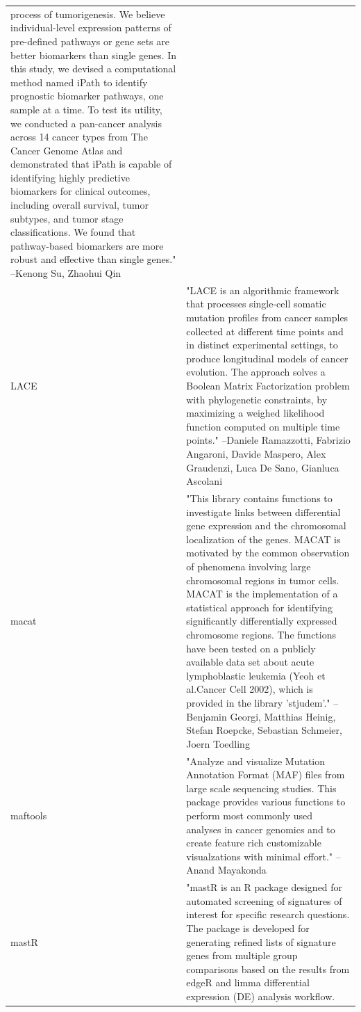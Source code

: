 \documentclass[]{article}
\begin{document}
\begin{longtable}[t]{l>{\raggedright\arraybackslash}p{25em}}
process of tumorigenesis. We believe individual-level
expression patterns of pre-defined pathways or gene sets are
better biomarkers than single genes. In this study, we devised
a computational method named iPath to identify prognostic
biomarker pathways, one sample at a time. To test its utility,
we conducted a pan-cancer analysis across 14 cancer types from
The Cancer Genome Atlas and demonstrated that iPath is capable
of identifying highly predictive biomarkers for clinical
outcomes, including overall survival, tumor subtypes, and tumor
stage classifications. We found that pathway-based biomarkers
are more robust and effective than single genes." --Kenong Su, Zhaohui Qin\\
\addlinespace
LACE & "LACE is an algorithmic framework that processes
single-cell somatic mutation profiles from cancer samples
collected at different time points and in distinct experimental
settings, to produce longitudinal models of cancer evolution.
The approach solves a Boolean Matrix Factorization problem with
phylogenetic constraints, by maximizing a weighed likelihood
function computed on multiple time points." --Daniele Ramazzotti, Fabrizio Angaroni, Davide Maspero, Alex Graudenzi, Luca De Sano, Gianluca Ascolani\\
macat & "This library contains functions to investigate links
between differential gene expression and the chromosomal
localization of the genes. MACAT is motivated by the common
observation of phenomena involving large chromosomal regions in
tumor cells. MACAT is the implementation of a statistical
approach for identifying significantly differentially expressed
chromosome regions. The functions have been tested on a
publicly available data set about acute lymphoblastic leukemia
(Yeoh et al.Cancer Cell 2002), which is provided in the library
'stjudem'." --Benjamin Georgi, Matthias Heinig, Stefan Roepcke, Sebastian Schmeier, Joern Toedling\\
maftools & "Analyze and visualize Mutation Annotation Format (MAF)
files from large scale sequencing studies. This package
provides various functions to perform most commonly used
analyses in cancer genomics and to create feature rich
customizable visualzations with minimal effort." --Anand Mayakonda\\
mastR & "mastR is an R package designed for automated screening of
signatures of interest for specific research questions. The
package is developed for generating refined lists of signature
genes from multiple group comparisons based on the results from
edgeR and limma differential expression (DE) analysis workflow.

\end{longtable}
\end{document}
